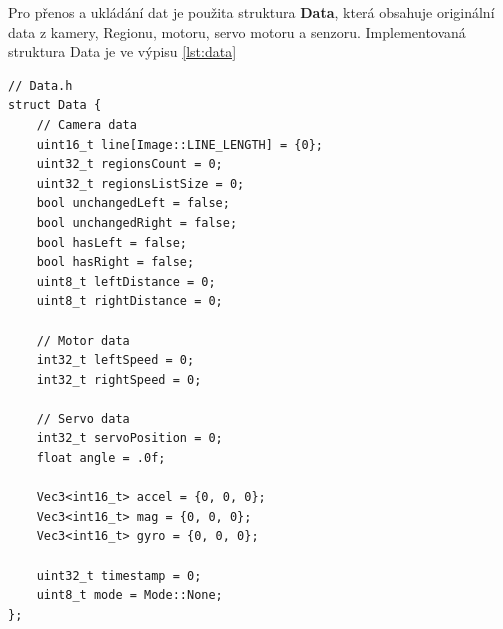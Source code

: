 Pro přenos a ukládání dat je použita struktura \textbf{Data}, která obsahuje
originální data z kamery, Regionu, motoru, servo motoru a senzoru.
Implementovaná struktura Data je ve výpisu \ref{lst:data}
\begin{lstlisting}[caption = Struktura Data, label = lst:data]
// Data.h
struct Data {
    // Camera data
    uint16_t line[Image::LINE_LENGTH] = {0};
    uint32_t regionsCount = 0;
    uint32_t regionsListSize = 0;
    bool unchangedLeft = false;
    bool unchangedRight = false;
    bool hasLeft = false;
    bool hasRight = false;
    uint8_t leftDistance = 0;
    uint8_t rightDistance = 0;

    // Motor data
    int32_t leftSpeed = 0;
    int32_t rightSpeed = 0;

    // Servo data
    int32_t servoPosition = 0;
    float angle = .0f;

    Vec3<int16_t> accel = {0, 0, 0};
    Vec3<int16_t> mag = {0, 0, 0};
    Vec3<int16_t> gyro = {0, 0, 0};

    uint32_t timestamp = 0;
    uint8_t mode = Mode::None;
};
\end{lstlisting}

\endinput
